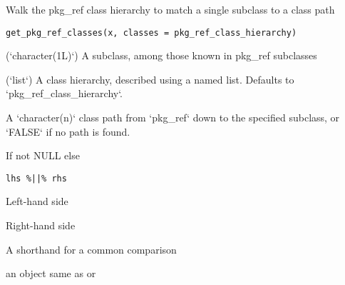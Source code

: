 \documentclass[a4paper]{book}
\begin{document}
%
\begin{Description}
Walk the pkg\_ref class hierarchy to match a single subclass to a class path
\end{Description}
%
\begin{Usage}
\begin{verbatim}
get_pkg_ref_classes(x, classes = pkg_ref_class_hierarchy)
\end{verbatim}
\end{Usage}
%
\begin{Arguments}
\begin{ldescription}
\item[\code{x}] (`character(1L)`) A subclass, among those known in pkg\_ref subclasses

\item[\code{classes}] (`list`) A class hierarchy, described using a named list.
Defaults to `pkg\_ref\_class\_hierarchy`.
\end{ldescription}
\end{Arguments}
%
\begin{Value}
A `character(n)` class path from `pkg\_ref` down to the specified
subclass, or `FALSE` if no path is found.
\end{Value}
%
\begin{Description}
If not NULL else
\end{Description}
%
\begin{Usage}
\begin{verbatim}
lhs %||% rhs
\end{verbatim}
\end{Usage}
%
\begin{Arguments}
\begin{ldescription}
\item[\code{lhs}] Left-hand side

\item[\code{rhs}] Right-hand side

A shorthand for a common comparison
\end{ldescription}
\end{Arguments}
%
\begin{Value}
an object same as  or 
\end{Value}
\end{document}
